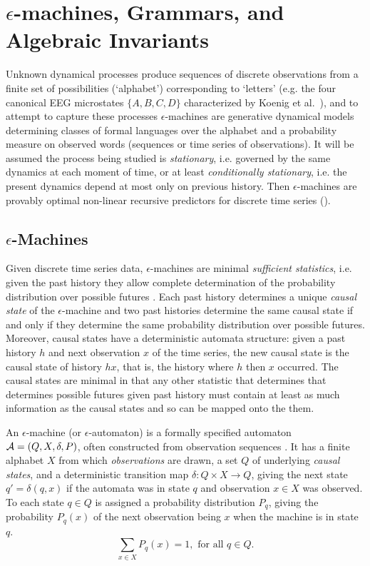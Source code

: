 \documentclass[journal]{IEEEtran}
\begin{document}
\section{$\epsilon$-machines, Grammars, and Algebraic Invariants}\label{secII}

Unknown dynamical processes produce sequences of discrete observations from a finite set of possibilities (`alphabet') corresponding to `letters'  (e.g. the four canonical EEG microstates $\{A,B,C,D\}$  characterized by
Koenig et al.\ \cite{Koenig2002}), and to attempt to capture these processes
$\epsilon$-machines are generative dynamical models determining classes of formal languages over the alphabet and a probability measure on observed words (sequences or time series of observations).   It will be assumed the process being studied is {\em stationary}, i.e. governed by the same dynamics at each moment of time,  or at least {\em conditionally stationary}, i.e. the  present dynamics depend at most only on previous history.  Then 
$\epsilon$-machines are provably optimal non-linear recursive predictors for discrete time series  (\cite{CrutchfieldYoung1989,Crutchfield1993,Shalizi2004}).

\subsection{$\epsilon$-Machines}
 
Given discrete time series data, $\epsilon$-machines are minimal {\em sufficient statistics}, i.e. given the past history they allow complete determination of the probability distribution over possible futures \cite{CrutchfieldYoung1989}.  Each past history determines a unique {\em causal state} of the $\epsilon$-machine and two past histories determine the same causal state if and only if they determine the same probability distribution over possible futures. Moreover, causal states have a deterministic automata structure:
given a past history $h$ and next observation $x$ of the time series, the new causal state is the causal state of history $hx$, that is, the history where $h$ then $x$ occurred.
The causal states are minimal in that any other statistic that determines that determines possible futures given past history must contain at least as much information as the causal states  \cite{CrutchfieldYoung1989} and so can be mapped onto the them. 



An $\epsilon$-machine (or $\epsilon$-automaton) is a formally specified automaton ${\cal A}=(Q,X,\delta, P)$,  often constructed from observation sequences
\cite{Crutchfield1993}.  It has a finite alphabet $X$ from which {\em observations} are drawn, a set  $Q$ of underlying {\em causal states}, and a deterministic
transition map $\delta: Q \times X \rightarrow Q$, giving the next state $q'=\delta(q,x)$ if the automata was in state $q$ and observation $x\in X$ was
observed.  To each state $q\in Q$ is assigned a probability distribution $P_q$, giving the probability $P_q(x)$ of the next observation
being $x$ when the machine is in state $q$.   
$$ \sum_{x\in X} P_q(x) =1, \mbox{ for all $q \in Q$}. $$
\end{document}
